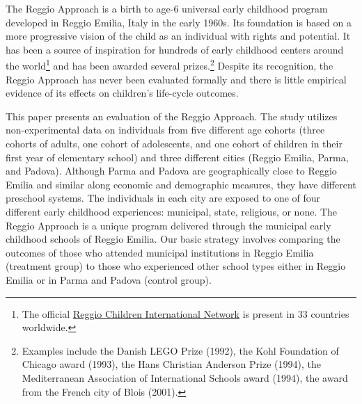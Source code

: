 The Reggio Approach is a birth to age-6 universal early childhood program developed in Reggio Emilia, Italy in the early 1960s. Its foundation is based on a more progressive vision of the child as an individual with rights and potential. It has been a source of inspiration for hundreds of early childhood centers around the world\footnote{The official \href{http://www.reggiochildren.it/network/?lang=en}{Reggio Children International Network} is present in 33 countries worldwide.} and has been awarded several prizes.\footnote{Examples include the Danish LEGO Prize (1992), the Kohl Foundation of Chicago award (1993), the Hans Christian Anderson Prize (1994), the Mediterranean Association of International Schools award (1994), the award from the French city of Blois (2001).} Despite its recognition, the Reggio Approach has never been evaluated formally and there is little empirical evidence of its effects on children's life-cycle outcomes. 

This paper presents an evaluation of the Reggio Approach. The study utilizes non-experimental data on individuals from five different age cohorts (three cohorts of adults, one cohort of adolescents, and one cohort of children in their first year of elementary school) and three different cities (Reggio Emilia, Parma, and Padova). Although Parma and Padova are geographically close to Reggio Emilia and similar along economic and demographic measures, they have different preschool systems. The individuals in each city are exposed to one of four different early childhood experiences: municipal, state, religious, or none. The Reggio Approach is a unique program delivered through the municipal early childhood schools of Reggio Emilia. Our basic strategy involves comparing the outcomes of those who attended municipal institutions in Reggio Emilia (treatment group) to those who experienced other school types either in Reggio Emilia or in Parma and Padova (control group).

